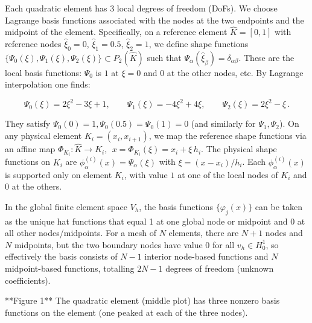 \documentclass[a4paper,10pt]{article}
\begin{document}
Each quadratic element has 3 local degrees of freedom (DoFs).
We choose Lagrange basis functions associated with the nodes at the two endpoints and the midpoint of the element.
Specifically, on a reference element $\hat K = [0,1]$ with reference nodes $\hat\xi_0=0$, $\hat\xi_1=0.5$, $\hat\xi_2=1$, we define shape functions $\{\Psi_0(\xi), \Psi_1(\xi), \Psi_2(\xi)\} \subset P_2(\hat K)$ such that $\Psi_\alpha(\hat\xi_\beta) = \delta_{\alpha\beta}$.
These are the local basis functions: $\Psi_0$ is $1$ at $\xi=0$ and $0$ at the other nodes, etc. By Lagrange interpolation one finds:

$$
	\Psi_0(\xi) = 2\xi^2 - 3\xi + 1,\qquad
	\Psi_1(\xi) = -4\xi^2 + 4\xi,\qquad
	\Psi_2(\xi) = 2\xi^2 - \xi\,.
$$

They satisfy $\Psi_0(0)=1,\Psi_0(0.5)=\Psi_0(1)=0$ (and similarly for $\Psi_1,\Psi_2$). On any physical element $K_i=(x_i,x_{i+1})$, we map the reference shape functions via an affine map $\Phi_{K_i}: \hat K \to K_i$, $\;x = \Phi_{K_i}(\xi) = x_i + \xi\,h_i$.
The physical shape functions on $K_i$ are $\phi_{\alpha}^{(i)}(x) = \Psi_\alpha(\xi)$ with $\xi = (x-x_i)/h_i$.
Each $\phi_{\alpha}^{(i)}(x)$ is supported only on element $K_i$, with value $1$ at one of the local nodes of $K_i$ and $0$ at the others.

In the global finite element space $V_h$, the basis functions $\{\varphi_j(x)\}$ can be taken as the unique hat functions that equal 1 at one global node or midpoint and 0 at all other nodes/midpoints.
For a mesh of $N$ elements, there are $N+1$ nodes and $N$ midpoints, but the two boundary nodes have value 0 for all $v_h \in H^1_0$, so effectively the basis consists of $N-1$ interior node-based functions and $N$ midpoint-based functions, totalling $2N-1$ degrees of freedom (unknown coefficients).

**Figure 1** The quadratic element (middle plot) has three nonzero basis functions on the element (one peaked at each of the three nodes).
\end{document}
